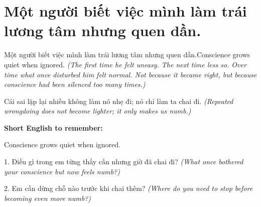 \section{Một người biết việc mình làm trái lương tâm nhưng quen dần.}
\begin{truyen}{Một người biết việc mình làm trái lương tâm nhưng quen dần.}{Conscience grows quiet when ignored.}
\textit{(The first time he felt uneasy. The next time less so. Over time what once disturbed him felt normal. Not because it became right, but because conscience had been silenced too many times.)}
\end{truyen}
\begin{baihoc}
Cái sai lặp lại nhiều không làm nó nhẹ đi; nó chỉ làm ta chai đi.
\textit{(Repeated wrongdoing does not become lighter; it only makes us numb.)}
\end{baihoc}
\begin{ghinhoanh}\textbf{Short English to remember:}

Conscience grows quiet when ignored.
\end{ghinhoanh}
\begin{tuhocnhanh}
1. Điều gì trong em từng thấy cấn nhưng giờ đã chai đi? \textit{(What once bothered your conscience but now feels numb?)}

2. Em cần dừng chỗ nào trước khi chai thêm? \textit{(Where do you need to stop before becoming even more numb?)}
\end{tuhocnhanh}
\ngancach